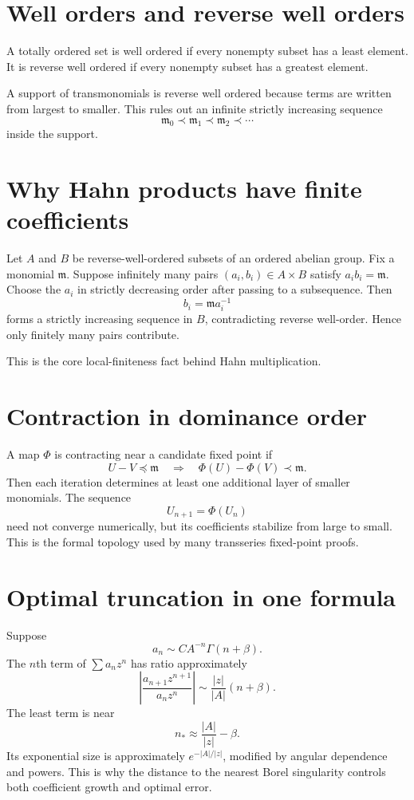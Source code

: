 \documentclass[11pt,openany]{book}
\theoremstyle{definition}
\theoremstyle{plain}
\theoremstyle{remark}
\newcommand{\m}{\mathfrak{m}}
\newcommand{\precdom}{\prec}
\newcommand{\preceqdom}{\preccurlyeq}
\begin{document}
\section{Well orders and reverse well orders}

A totally ordered set is well ordered if every nonempty subset has a least element. It is reverse well ordered if every nonempty subset has a greatest element.

A support of transmonomials is reverse well ordered because terms are written from largest to smaller. This rules out an infinite strictly increasing sequence
\[
 \m_0\precdom\m_1\precdom\m_2\precdom\cdots
\]
inside the support.

\section{Why Hahn products have finite coefficients}

Let $A$ and $B$ be reverse-well-ordered subsets of an ordered abelian group. Fix a monomial $\m$. Suppose infinitely many pairs $(a_i,b_i)\in A\times B$ satisfy $a_ib_i=\m$. Choose the $a_i$ in strictly decreasing order after passing to a subsequence. Then
\[
 b_i=\m a_i^{-1}
\]
forms a strictly increasing sequence in $B$, contradicting reverse well-order. Hence only finitely many pairs contribute.

This is the core local-finiteness fact behind Hahn multiplication.

\section{Contraction in dominance order}

A map $\Phi$ is contracting near a candidate fixed point if
\[
 U-V\preceqdom\m
 \quad\Longrightarrow\quad
 \Phi(U)-\Phi(V)\precdom\m.
\]
Then each iteration determines at least one additional layer of smaller monomials. The sequence
\[
 U_{n+1}=\Phi(U_n)
\]
need not converge numerically, but its coefficients stabilize from large to small. This is the formal topology used by many transseries fixed-point proofs.

\section{Optimal truncation in one formula}

Suppose
\[
 a_n\sim C A^{-n}\Gamma(n+\beta).
\]
The $n$th term of $\sum a_nz^n$ has ratio approximately
\[
 \left|\frac{a_{n+1}z^{n+1}}{a_nz^n}\right|
 \sim\frac{|z|}{|A|}(n+\beta).
\]
The least term is near
\[
 n_*\approx\frac{|A|}{|z|}-\beta.
\]
Its exponential size is approximately $e^{-|A|/|z|}$, modified by angular dependence and powers. This is why the distance to the nearest Borel singularity controls both coefficient growth and optimal error.
\end{document}
